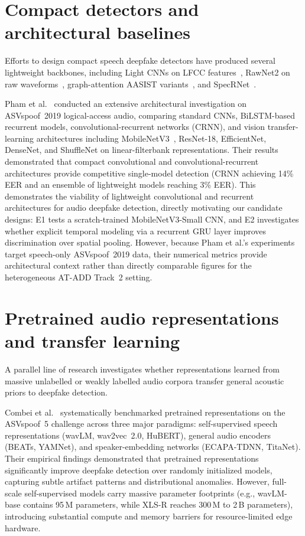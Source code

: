 \documentclass[12pt,a4paper]{report}
\begin{document}
\section{Compact detectors and architectural baselines}

Efforts to design compact speech deepfake detectors have produced several lightweight backbones, including Light CNNs on LFCC features~\cite{lavrentyeva2019stc}, RawNet2 on raw waveforms~\cite{tak2021rawnet2}, graph-attention AASIST variants~\cite{jung2022aasist}, and SpecRNet~\cite{kawa2022specrnet}. 

Pham et al.~\cite{pham2024deepfake} conducted an extensive architectural investigation on ASVspoof~2019 logical-access audio, comparing standard CNNs, BiLSTM-based recurrent models, convolutional-recurrent networks (CRNN), and vision transfer-learning architectures including MobileNetV3~\cite{howard2019mobilenetv3}, ResNet-18, EfficientNet, DenseNet, and ShuffleNet on linear-filterbank representations. Their results demonstrated that compact convolutional and convolutional-recurrent architectures provide competitive single-model detection (CRNN achieving 14\% EER and an ensemble of lightweight models reaching 3\% EER). This demonstrates the viability of lightweight convolutional and recurrent architectures for audio deepfake detection, directly motivating our candidate designs: E1 tests a scratch-trained MobileNetV3-Small CNN, and E2 investigates whether explicit temporal modeling via a recurrent GRU layer improves discrimination over spatial pooling. However, because Pham et al.'s experiments target speech-only ASVspoof~2019 data, their numerical metrics provide architectural context rather than directly comparable figures for the heterogeneous AT-ADD Track~2 setting.

\section{Pretrained audio representations and transfer learning}

A parallel line of research investigates whether representations learned from massive unlabelled or weakly labelled audio corpora transfer general acoustic priors to deepfake detection.

Combei et al.~\cite{combei2024wavlm} systematically benchmarked pretrained representations on the ASVspoof~5 challenge across three major paradigms: self-supervised speech representations (wavLM, wav2vec~2.0, HuBERT), general audio encoders (BEATs, YAMNet), and speaker-embedding networks (ECAPA-TDNN, TitaNet). Their empirical findings demonstrated that pretrained representations significantly improve deepfake detection over randomly initialized models, capturing subtle artifact patterns and distributional anomalies. However, full-scale self-supervised models carry massive parameter footprints (e.g., wavLM-base contains 95\,M parameters, while XLS-R reaches 300\,M to 2\,B parameters), introducing substantial compute and memory barriers for resource-limited edge hardware.
\end{document}
